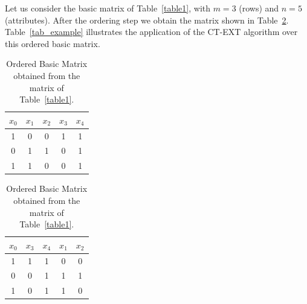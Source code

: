 \documentclass[authoryear,preprint,review,12pt]{elsarticle}
\begin{document}
Let us consider the basic matrix of Table~\ref{table1}, with $m=3$ (rows) and $n=5$ (attributes). After the
ordering step we obtain the matrix shown in Table~\ref{table2}. Table~\ref{tab_example} illustrates the
application of the CT-EXT algorithm over this ordered basic matrix.

\begin{table}[!htb]
\begin{minipage}{.5\linewidth}
\caption{Basic Matrix for the example.}\label{table1}
\centering
\begin{tabular}{ ccccc }
\hline
$x_0$ & $x_1$ & $x_2$ & $x_3$ & $x_4$ \\
\hline
1 & 0 & 0 & 1 & 1 \\
0 & 1 & 1 & 0 & 1 \\
1 & 1 & 0 & 0 & 1 \\
\hline
\end{tabular}
\end{minipage}%
\begin{minipage}{.5\linewidth}
\centering
\caption{Ordered Basic Matrix obtained from the matrix of Table~\ref{table1}.}\label{table2}
\begin{tabular}{ ccccc }
\hline
$x_0$ & $x_3$ & $x_4$ & $x_1$ & $x_2$ \\
\hline
1 & 1 & 1 & 0 & 0 \\
0 & 0 & 1 & 1 & 1 \\
1 & 0 & 1 & 1 & 0 \\
\hline
\end{tabular}
\end{minipage}
\end{table}
\end{document}
